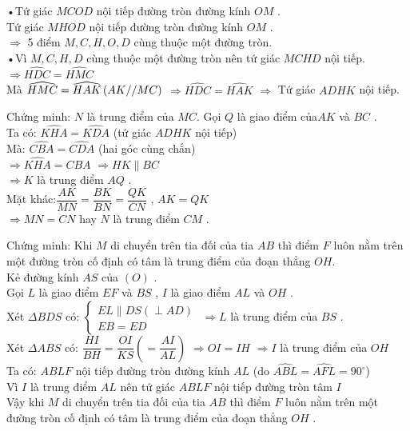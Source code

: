 \begin{bt}[3,0 điểm]
{\begin{listEX}
\item
•Tứ giác $MCOD$ nội tiếp đường tròn đường kính $OM$ .\\
Tứ giác $MHOD$ nội tiếp đường tròn đường kính $OM$ .\\
$\Rightarrow $ 5 điểm $M,C,H,O,D$ cùng thuộc một đường tròn.\\
•Vì $M,C,H,D$ cùng thuộc một đường tròn nên tứ giác $MCHD$ nội tiếp.\\
$\Rightarrow\widehat{HDC}=\widehat{HMC}$\\
Mà $\widehat{HMC}=\widehat{HAK}{\rm}\left(AK{\rm{//}}MC\right)$ $\Rightarrow\widehat{HDC}=\widehat{HAK}$ $\Rightarrow $ Tứ giác $ADHK$ nội tiếp.
\item Chứng minh: $N$ là trung điểm của $MC$.
Gọi $Q$ là giao điểm của$AK$ và $BC$ .\\
Ta có: $\widehat{KHA}=\widehat{KDA}$ (tứ giác $ADHK$ nội tiếp)\\
Mà: $\widehat{CBA}=\widehat{CDA}$ (hai góc cùng chắn)\\
$\Rightarrow\widehat{KHA}=\widehat{CBA}$ $\Rightarrow HK\parallel BC$\\
$\Rightarrow K$ là trung điểm $AQ$ .\\
Mặt khác:$\dfrac{AK}{MN}=\dfrac{BK}{BN}=\dfrac{QK}{CN}$ , $AK=QK$\\
$\Rightarrow MN=CN$ hay $N$ là trung điểm $CM$ .
\item Chứng minh: Khi $M$ di chuyển trên tia đối của tia $AB$ thì điểm $F$ luôn nằm trên một đường tròn cố định có tâm là trung điểm của đoạn thẳng $OH$. \\
Kẻ đường kính $AS$ của $(O)$ .\\
Gọi $L$ là giao điểm $EF$ và $BS$ , $I$ là giao điểm $AL$ và $OH$ .\\
Xét $\Delta BDS$ có: $\left\{\begin{array}{l}
EL\parallel DS\left(\perp AD\right)\\
EB=ED
\end{array}\right.$ $\Rightarrow L$ là trung điểm của $BS$ .\\
Xét $\Delta ABS$ có: $\dfrac{HI}{BH}=\dfrac{OI}{KS}\left(=\dfrac{AI}{AL}\right)$ $\Rightarrow OI=IH$ $\Rightarrow I$ là trung điểm của $OH$ \\
Ta có: $ABLF$ nội tiếp đường tròn đường kính $AL$ (do $\widehat{ABL}=\widehat{AFL}=90^\circ $)\\
Vì $I$ là trung điểm $AL$ nên tứ giác $ABLF$ nội tiếp đường tròn tâm $I$\\
Vậy khi $M$ di chuyển trên tia đối của tia $AB$ thì điểm $F$ luôn nằm trên một đường tròn cố định có tâm là trung điểm của đoạn thẳng $OH$ .\\
\end{listEX}
}
\end{bt}